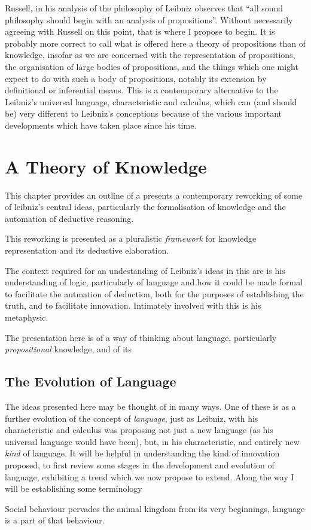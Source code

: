 Russell, in his analysis of the philosophy of Leibniz observes that ``all sound philosophy should begin with an analysis of propositions''.
Without necessarily agreeing with Russell on this point, that is where I propose to begin.
It is probably more correct to call what is offered here a theory of propositions than of knowledge,
insofar as we are concerned with the representation of propositions, the organisation of large bodies of
propositions, and the things which one might expect to do with such a body of propositions, notably
its extension by definitional or inferential means.
This is a contemporary alternative to the Leibniz's universal language, characteristic and calculus,
which can (and should be) very different to Leibniz's conceptions because of the various important
developments which have taken place since his time.

\chapter{A Theory of Knowledge}\label{TheoryOfKnowledge}

This chapter provides an outline of a presents a contemporary reworking of some of leibniz's central
ideas, particularly the formalisation of knowledge and the automation of deductive reasoning.

This reworking is presented as a pluralistic \emph{framework} for knowledge representation and its
deductive elaboration.

The context required for an undestanding of Leibniz's ideas in this are is his
understanding of logic, particularly of language and how it could be made formal
to facilitate the autmation of deduction, both for the purposes of establishing
the truth, and to facilitate innovation.
Intimately involved with this is his metaphysic.

The presentation here is of a way of thinking about language, particularly \emph{propositional} knowledge,
and of its  

\section{The Evolution of Language}

The ideas presented here may be thought of in many ways.
One of these is as a further evolution of the concept of \emph{language}, just as
Leibniz, with his characteristic and calculus was proposing not just a new language
(as his universal language would have been), but, in his characteristic, and entirely
new {\it kind} of language.
It will be helpful in understanding the kind of innovation proposed, to first review
some stages in the development and evolution of language, exhibiting a trend which
we now propose to extend.
Along the way I will be establishing some terminology


Social behaviour pervades the animal kingdom from its very beginnings, language is
a part of that behaviour.

